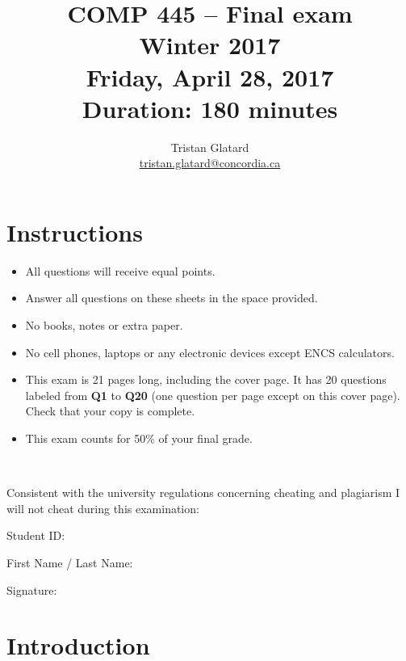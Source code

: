 \documentclass{llncs}
\title{COMP 445 -- Final exam \\ Winter 2017 \\ Friday, April 28, 2017 \\ Duration: 180 minutes}
\author{Tristan Glatard\\
  \href{mailto:tristan.glatard@concordia.ca}{tristan.glatard@concordia.ca}\\
  \vspace*{0.3cm}
  }
\institute{Concordia University\\
  Department of Computer Science and Software Engineering}
\newcounter{ques}
\newcommand{\myspace}[0]{\vspace*{0.25cm}}
\begin{document}
\maketitle

\section*{Instructions}
\begin{itemize}
\item All questions will receive equal points.
\item Answer all questions on these sheets in the space provided.
\item No books, notes or extra paper.
\item No cell phones, laptops or any electronic devices except ENCS calculators.
\item This exam is 21 pages long, including the cover page. It has 20 questions labeled from \textbf{Q1} to \textbf{Q20} (one question per page except on this cover page). Check that your copy is complete.
\item This exam counts for 50\% of your final grade.
\end{itemize}

\myspace

\myspace

\hrulefill\\

\myspace

Consistent with the university regulations concerning cheating and plagiarism I will not cheat during this examination:

\myspace

\myspace

Student ID: \dotfill

\myspace

\myspace

First Name / Last Name: \dotfill

\myspace

\myspace

Signature: \dotfill

\myspace

\myspace

\hrulefill

\newpage

\section{Introduction}
\end{document}
